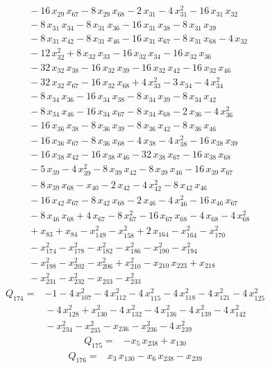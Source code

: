 \documentclass[11pt]{article}
\theoremstyle{definition}\newtheorem{definition}[theorem]{Definition}
\begin{document}
\begin{align*}
\\ &{}-16\,x_{29}\,x_{67}-8\,x_{29}\,x_{68}-2\,x_{31}-4\,x_{31}^{2}-16\,x_{31}\,x_{32}
\\ &{}-8\,x_{31}\,x_{34}-8\,x_{31}\,x_{36}-16\,x_{31}\,x_{38}-8\,x_{31}\,x_{39}
\\ &{}-8\,x_{31}\,x_{42}-8\,x_{31}\,x_{46}-16\,x_{31}\,x_{67}-8\,x_{31}\,x_{68}-4\,x_{32}
\\ &{}-12\,x_{32}^{2}+8\,x_{32}\,x_{33}-16\,x_{32}\,x_{34}-16\,x_{32}\,x_{36}
\\ &{}-32\,x_{32}\,x_{38}-16\,x_{32}\,x_{39}-16\,x_{32}\,x_{42}-16\,x_{32}\,x_{46}
\\ &{}-32\,x_{32}\,x_{67}-16\,x_{32}\,x_{68}+4\,x_{33}^{2}-3\,x_{34}-4\,x_{34}^{2}
\\ &{}-8\,x_{34}\,x_{36}-16\,x_{34}\,x_{38}-8\,x_{34}\,x_{39}-8\,x_{34}\,x_{42}
\\ &{}-8\,x_{34}\,x_{46}-16\,x_{34}\,x_{67}-8\,x_{34}\,x_{68}-2\,x_{36}-4\,x_{36}^{2}
\\ &{}-16\,x_{36}\,x_{38}-8\,x_{36}\,x_{39}-8\,x_{36}\,x_{42}-8\,x_{36}\,x_{46}
\\ &{}-16\,x_{36}\,x_{67}-8\,x_{36}\,x_{68}-4\,x_{38}-4\,x_{38}^{2}-16\,x_{38}\,x_{39}
\\ &{}-16\,x_{38}\,x_{42}-16\,x_{38}\,x_{46}-32\,x_{38}\,x_{67}-16\,x_{38}\,x_{68}
\\ &{}-5\,x_{39}-4\,x_{39}^{2}-8\,x_{39}\,x_{42}-8\,x_{39}\,x_{46}-16\,x_{39}\,x_{67}
\\ &{}-8\,x_{39}\,x_{68}-x_{40}-2\,x_{42}-4\,x_{42}^{2}-8\,x_{42}\,x_{46}
\\ &{}-16\,x_{42}\,x_{67}-8\,x_{42}\,x_{68}-2\,x_{46}-4\,x_{46}^{2}-16\,x_{46}\,x_{67}
\\ &{}-8\,x_{46}\,x_{68}+4\,x_{67}-8\,x_{67}^{2}-16\,x_{67}\,x_{68}-4\,x_{68}-4\,x_{68}^{2}
\\ &{}+x_{83}+x_{84}-x_{149}^{2}-x_{158}^{2}+2\,x_{164}-x_{164}^{2}-x_{170}^{2}
\\ &{}-x_{174}^{2}-x_{178}^{2}-x_{182}^{2}-x_{186}^{2}-x_{190}^{2}-x_{194}^{2}
\\ &{}-x_{198}^{2}-x_{202}^{2}-x_{206}^{2}+x_{210}^{2}-x_{210}\,x_{223}+x_{218}
\\ &{}-x_{231}^{2}-x_{232}^{2}-x_{233}-x_{233}^{2}
\end{align*}
\begin{align*}
Q_{174}={}&-1-4\,x_{107}^{2}-4\,x_{112}^{2}-4\,x_{115}^{2}-4\,x_{118}^{2}-4\,x_{121}^{2}-4\,x_{125}^{2}
\\ &{}-4\,x_{128}^{2}+x_{130}^{2}-4\,x_{132}^{2}-4\,x_{136}^{2}-4\,x_{139}^{2}-4\,x_{142}^{2}
\\ &{}-x_{234}^{2}-x_{235}^{2}-x_{236}-x_{236}^{2}-4\,x_{239}^{2}
\end{align*}
\begin{align*}
Q_{175}={}&-x_{5}\,x_{238}+x_{130}
\end{align*}
\begin{align*}
Q_{176}={}&x_{3}\,x_{130}-x_{6}\,x_{238}-x_{239}
\end{align*}
\endgroup
\end{document}
